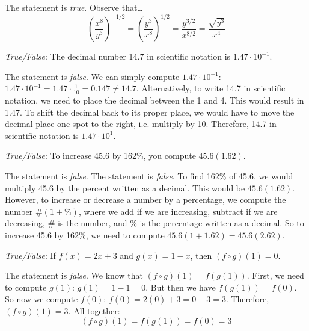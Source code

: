 \documentclass[11pt,letterpaper]{article}
\begin{document}
\sol The statement is \textit{true}. Observe that\dots
	\[
	\left( \dfrac{x^8}{y^3} \right)^{-1/2}= \left( \dfrac{y^3}{x^8} \right)^{1/2}= \dfrac{y^{3/2}}{x^{8/2}}= \dfrac{\sqrt{y^3}}{x^4}
	\]



\newpage



\quizsol \textit{True/False}: The decimal number 14.7 in scientific notation is $1.47 \cdot 10^{-1}$. \pspace

\sol The statement is \textit{false}. We can simply compute $1.47 \cdot 10^{-1}$: $1.47 \cdot 10^{-1}= 1.47 \cdot \frac{1}{10}= 0.147 \neq 14.7$. Alternatively, to write 14.7 in scientific notation, we need to place the decimal between the 1 and 4. This would result in 1.47. To shift the decimal back to its proper place, we would have to move the decimal place one spot to the right, i.e. multiply by 10. Therefore, 14.7 in scientific notation is $1.47 \cdot 10^1$. \pvspace{1.5cm}



\quizsol \textit{True/False}: To increase 45.6 by 162\%, you compute $45.6(1.62)$. \pspace

\sol The statement is \textit{false}. The statement is \textit{false}. To find 162\% of 45.6, we would multiply 45.6 by the percent written as a decimal. This would be $45.6(1.62)$. However, to increase or decrease a number by a percentage, we compute the number $\#(1 \pm \%)$, where we add if we are increasing, subtract if we are decreasing, $\#$ is the number, and \% is the percentage written as a decimal. So to increase 45.6 by 162\%, we need to compute $45.6(1 + 1.62)= 45.6(2.62)$. \pvspace{1.5cm}



\quizsol \textit{True/False}: If $f(x)= 2x + 3$ and $g(x)= 1 - x$, then $(f \circ g)(1)= 0$. \pspace

\sol The statement is \textit{false}. We know that $(f \circ g)(1)= f(g(1))$. First, we need to compute $g(1)$: $g(1)= 1 - 1= 0$. But then we have $f(g(1))= f(0)$. So now we compute $f(0)$: $f(0)= 2(0) + 3= 0 + 3= 3$. Therefore, $(f \circ g)(1)= 3$. All together:
	\[
	(f \circ g)(1)= f(g(1))= f(0)= 3
	\]
\end{document}
